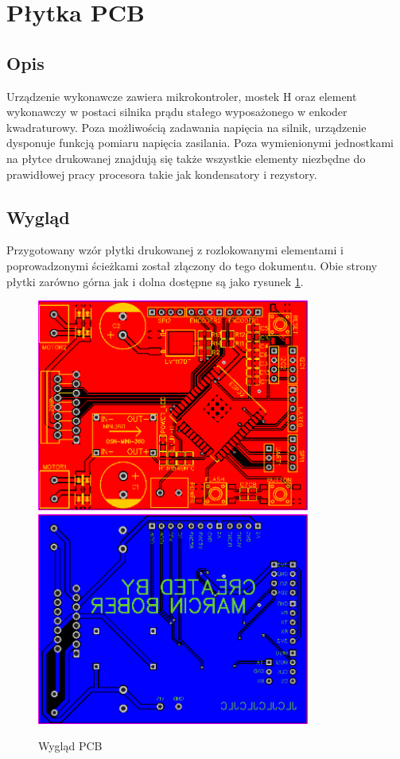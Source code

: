         \section{Płytka PCB}
            \subsection{Opis}
                Urządzenie wykonawcze zawiera mikrokontroler, mostek H oraz element wykonawczy w postaci silnika prądu stałego wyposażonego w enkoder kwadraturowy. Poza możliwością zadawania napięcia na silnik, urządzenie dysponuje funkcją pomiaru napięcia zasilania. Poza wymienionymi jednostkami na płytce drukowanej znajdują się także wszystkie elementy niezbędne do prawidłowej pracy procesora takie jak kondensatory i rezystory.
          
            \subsection{Wygląd}
                Przygotowany wzór płytki drukowanej z rozlokowanymi elementami i poprowadzonymi ścieżkami został złączony do tego dokumentu. Obie strony płytki zarówno górna jak i dolna dostępne są jako rysunek \ref{fig:pcb}.
                
                \begin{figure}[ht]
                    \centering
                    \includegraphics[width=0.8\textwidth]{img/pcb_front.png}
                    \includegraphics[width=0.8\textwidth]{img/pcb_back.png}
                    \caption{Wygląd PCB}
                    \label{fig:pcb}
                \end{figure}
    

